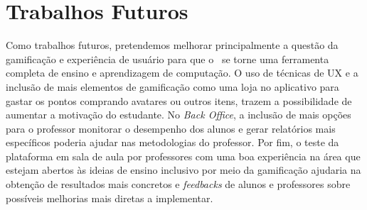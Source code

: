 \section{Trabalhos Futuros}

Como trabalhos futuros, pretendemos melhorar principalmente a questão da gamificação e experiência de usuário para que o \appName\ se torne uma ferramenta completa de ensino e aprendizagem de computação. O uso de técnicas de UX \cite{ux} e a inclusão de mais elementos de gamificação \cite{gamification_motivates} como uma loja no aplicativo para gastar os pontos comprando avatares ou outros itens, trazem a possibilidade de aumentar a motivação do estudante. No \textit{Back Office}, a inclusão de mais opções para o professor monitorar o desempenho dos alunos e gerar relatórios mais específicos poderia ajudar nas metodologias do professor.
Por fim, o teste da plataforma em sala de aula por professores com uma boa experiência na área que estejam abertos às ideias de ensino inclusivo por meio da gamificação ajudaria na obtenção de resultados mais concretos e \textit{feedbacks} de alunos e professores sobre possíveis melhorias mais diretas a implementar.
